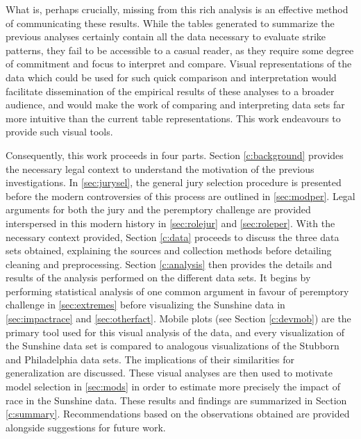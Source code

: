 What is, perhaps crucially, missing from this rich analysis is an effective method of communicating these results. While the
tables generated to summarize the previous analyses certainly contain
all the data necessary to evaluate strike patterns, they fail
to be accessible to a casual reader, as they require some degree of commitment and focus to interpret and compare. Visual
representations of the data which could be used for such quick
comparison and interpretation would facilitate dissemination of
the empirical results of these analyses to a broader audience, and would make the work of comparing and interpreting data sets far
more intuitive than the current table representations. This work endeavours to provide such visual tools.

Consequently, this work proceeds in four parts. Section \ref{c:background} provides the necessary legal context to understand the
motivation of the previous investigations. In \ref{sec:jurysel}, the general jury selection procedure is presented before the
modern controversies of this process are outlined in \ref{sec:modper}. Legal arguments for both the jury and the peremptory
challenge are provided interspersed in this modern history in \ref{sec:rolejur} and \ref{sec:roleper}. With the necessary context provided, Section \ref{c:data} proceeds to discuss the three data sets obtained, explaining the sources
and collection methods before detailing cleaning and
preprocessing. Section \ref{c:analysis} then provides the details and results
of the analysis performed on the different data sets. It begins by performing statistical analysis of one common argument in
favour of peremptory challenge in \ref{sec:extremes} before visualizing the Sunshine data in \ref{sec:impactrace} and
\ref{sec:otherfact}. Mobile plots (see Section \ref{c:devmob}) are the primary tool used for this visual analysis of the data, and
every visualization of the Sunshine data set is compared to analogous visualizations of the Stubborn and Philadelphia data
sets. The implications of their similarities for generalization are discussed. These visual analyses are then used to motivate
model selection in \ref{sec:mods} in order to estimate more precisely the impact of race in the Sunshine data. These results and
findings are summarized in Section \ref{c:summary}. Recommendations based on the observations obtained are provided alongside suggestions for future work.
